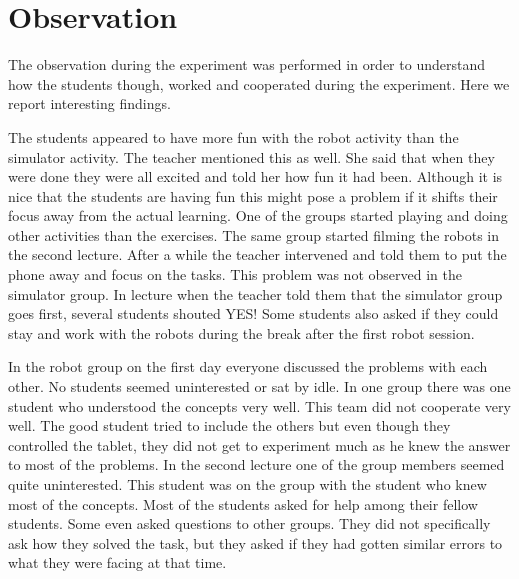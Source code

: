 \chapter{Observation}
The observation during the experiment was performed in order to understand how the students though, worked and cooperated during the experiment. Here we report interesting findings.

\bigskip\noindent
The students appeared to have more fun with the robot activity than the simulator activity. The teacher mentioned this as well. She said that when they were done they were all excited and told her how fun it had been. Although it is nice that the students are having fun this might pose a problem if it shifts their focus away from the actual learning. One of the groups started playing and doing other activities than the exercises. The same group started filming the robots in the second lecture. After a while the teacher intervened and told them to put the phone away and focus on the tasks. This problem was not observed in the simulator group. In lecture when the teacher told them that the simulator group goes first, several students shouted YES! Some students also asked if they could stay and work with the robots during the break after the first robot session. 

\bigskip\noindent
In the robot group on the first day everyone discussed the problems with each other. No students seemed uninterested or sat by idle. In one group there was one student who understood the concepts very well. This team did not cooperate very well. The good student tried to include the others but even though they controlled the tablet, they did not get to experiment much as he knew the answer to most of the problems. In the second lecture one of the group members seemed quite uninterested. This student was on the group with the student who knew most of the concepts. Most of the students asked for help among their fellow students. Some even asked questions to other groups. They did not specifically ask how they solved the task, but they asked if they had gotten similar errors to what they were facing at that time.

